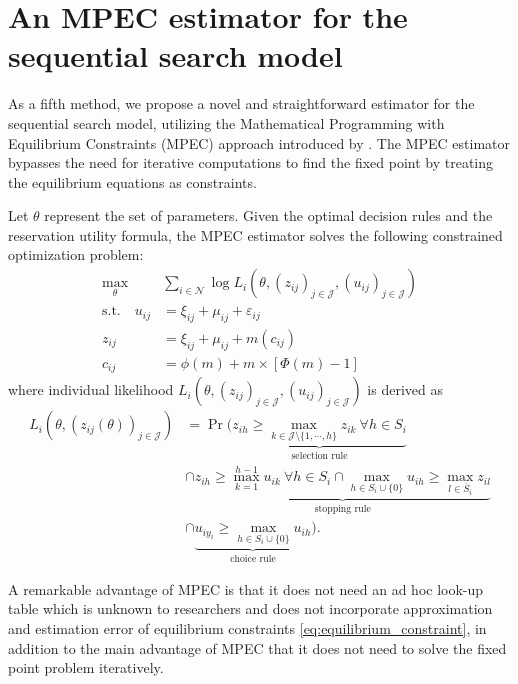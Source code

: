 \documentclass[12pt]{article}
\begin{document}
\section{An MPEC estimator for the sequential search model}
As a fifth method, we propose a novel and straightforward estimator for the sequential search model, utilizing the Mathematical Programming with Equilibrium Constraints (MPEC) approach introduced by \cite{su2012constrained}. 
The MPEC estimator bypasses the need for iterative computations to find the fixed point by treating the equilibrium equations as constraints.

Let \(\theta\) represent the set of parameters. Given the optimal decision rules and the reservation utility formula, the MPEC estimator solves the following constrained optimization problem:
\begin{align}
    \max_{\theta}& \sum_{i\in \mathcal{N}} \log L_{i}(\theta,(z_{ij})_{j\in \mathcal{J}},(u_{ij})_{j\in \mathcal{J}})\nonumber\\
    \text{s.t.}\quad u_{i j} & =\xi_{i j}+\mu_{i j}+\varepsilon_{i j}\label{eq:mpec_formula}\\
    z_{i j}&=\xi_{i j}+\mu_{i j}+m\left(c_{i j}\right) \nonumber\\
    c_{i j}&=\phi(m)+m \times[\Phi(m)-1] \nonumber
\end{align}
where individual likelihood $L_{i}(\theta,(z_{ij})_{j\in \mathcal{J}},(u_{ij})_{j\in \mathcal{J}})$ is derived as
\begin{align*}
    L_{i}(\theta,(z_{ij}(\theta))_{j\in \mathcal{J}}) &= \Pr (\underbrace{z_{ih} \geq \max_{k \in \mathcal{J}\setminus \{1,\cdots,h\}} z_{ik} \: \forall h \in S_i}_{\text{selection rule}}\\
    & \cap \underbrace{z_{ih} \geq \max_{k = 1}^{h-1} u_{ik} \: \forall h \in S_i \cap \max_{h \in S_i \cup \{0\}} u_{ih} \geq \max_{l \in \bar{S}_i} z_{il} }_{\text{stopping rule}}\\
    & \cap \underbrace{u_{iy_i} \geq \max_{h \in S_i \cup \{0\}} u_{ih} }_{\text{choice rule}}).
\end{align*}

A remarkable advantage of MPEC is that it does not need an ad hoc look-up table which is unknown to researchers and does not incorporate approximation and estimation error of equilibrium constraints \eqref{eq:equilibrium_constraint}, in addition to the main advantage of MPEC that it does not need to solve the fixed point problem iteratively.
\end{document}
